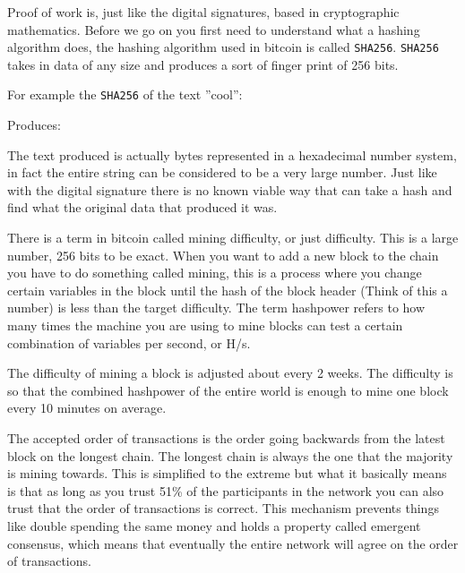 Proof of work is, just like the digital signatures, based in cryptographic mathematics. Before we go on you first need to understand what a hashing algorithm does, the hashing algorithm used in bitcoin is called \texttt{SHA256}. \texttt{SHA256} takes in data of any size and produces a sort of finger print of 256 bits. 

For example the \texttt{SHA256} of the text ''cool'': 


Produces: 


The text produced is actually bytes represented in a hexadecimal number system, in fact the entire string can be considered to be a very large number. Just like with the digital signature there is no known viable way that can take a hash and find what the original data that produced it was. 

There is a term in bitcoin called mining difficulty, or just difficulty. This is a large number, 256 bits to be exact. When you want to add a new block to the chain you have to do something called mining, this is a process where you change certain variables in the block until the hash of the block header (Think of this a number) is less than the target difficulty. The term hashpower refers to how many times the machine you are using to mine blocks can test a certain combination of variables per second, or H/s.

The difficulty of mining a block is adjusted about every 2 weeks. The difficulty is so that the combined hashpower of the entire world is enough to mine one block every 10 minutes on average.\cite{antonopoulos_2017}

The accepted order of transactions is the order going backwards from the latest block on the longest chain. The longest chain is always the one that the majority is mining towards. This is simplified to the extreme but what it basically means is that as long as you trust 51\% of the participants in the network you can also trust that the order of transactions is correct. This mechanism prevents things like double spending the same money and holds a property called emergent consensus, which means that eventually the entire network will agree on the order of transactions.

